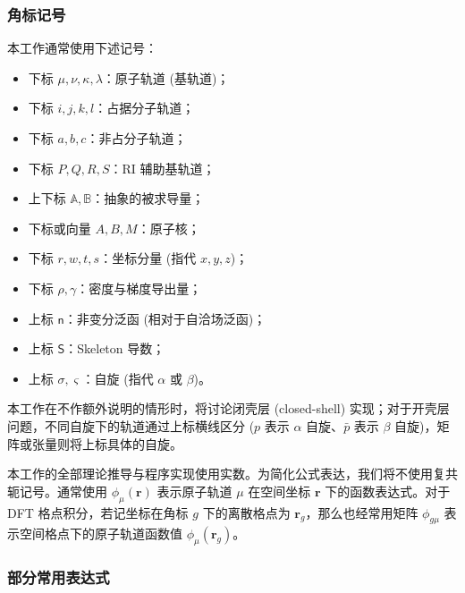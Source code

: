 \subsubsection{角标记号}

本工作通常使用下述记号：
\begin{itemize}[nosep]
  \item 下标 $\mu, \nu, \kappa, \lambda$：原子轨道 (基轨道)；
  \item 下标 $i, j, k, l$：占据分子轨道；
  \item 下标 $a, b, c$：非占分子轨道；
  \item 下标 $P, Q, R, S$：RI 辅助基轨道；
  \item 上下标 $\mathbb{A}, \mathbb{B}$：抽象的被求导量；
  \item 下标或向量 $A, B, M$：原子核；
  \item 下标 $r, w, t, s$：坐标分量 (指代 $x, y, z$)；
  \item 下标 $\rho, \gamma$：密度与梯度导出量；
  \item 上标 $\textsf{n}$：非变分泛函 (相对于自洽场泛函)；
  \item 上标 $\textsf{S}$：Skeleton 导数；
  \item 上标 $\sigma, \varsigma$：自旋 (指代 $\alpha$ 或 $\beta$)。
\end{itemize}

本工作在不作额外说明的情形时，将讨论闭壳层 (closed-shell) 实现；对于开壳层问题，不同自旋下的轨道通过上标横线区分 ($p$ 表示 $\alpha$ 自旋、$\bar p$ 表示 $\beta$ 自旋)，矩阵或张量则将上标具体的自旋。

本工作的全部理论推导与程序实现使用实数。为简化公式表达，我们将不使用复共轭记号。通常使用 $\phi_\mu (\bm{r})$ 表示原子轨道 $\mu$ 在空间坐标 $\bm{r}$ 下的函数表达式。对于 DFT 格点积分，若记坐标在角标 $g$ 下的离散格点为 $\bm{r}_g$，那么也经常用矩阵 $\phi_{g \mu}$ 表示空间格点下的原子轨道函数值 $\phi_\mu (\bm{r}_g)$。

\subsubsection{部分常用表达式}

